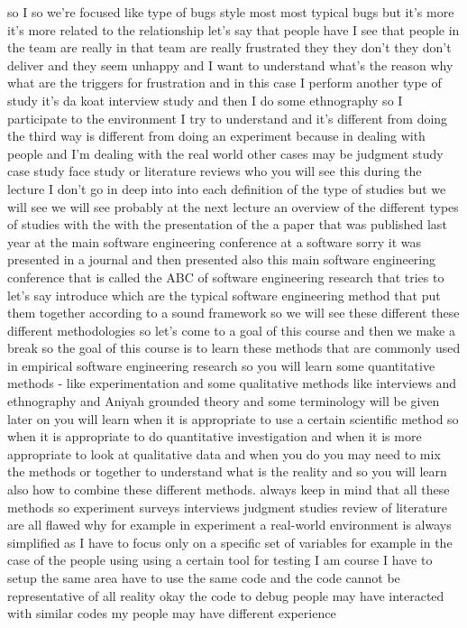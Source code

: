 \documentclass[conference, compsoc, twoside]{IEEEtran}
\begin{document}
so I so we're focused like type of bugs style most most typical bugs but it's more it's more related to the relationship let's say that people have I see that people in the team are really in that team are really frustrated they they don't they don't deliver and they seem unhappy and I want to understand what's the reason why what are the triggers for frustration and in this case I perform another type of study it's da koat interview study and then I do some ethnography 
so I participate to the environment I try to understand and it's different from doing the third way is different from doing an experiment because in dealing with people and I'm dealing with the real world other cases may be judgment study case study face study or literature reviews who you will see this during the lecture I don't go in deep into into each definition of the type of studies but we will see we will see probably at the next lecture an overview of the different types of studies with the with the presentation of the a paper that was published last year at the main software engineering conference at a software sorry it was presented in a journal and then presented also this main software engineering conference that is called the ABC of software engineering research that tries to let's say introduce which are the typical software engineering method that put them together according to a sound framework so we will see these different these different methodologies so let's come to a goal of this course and then we make a break so the goal of this course is to learn these methods that are commonly used in empirical software engineering research so you will learn some quantitative methods - like experimentation and some qualitative methods like interviews and ethnography and Aniyah grounded theory and some terminology will be given later on you will learn when it is appropriate to use a certain scientific method so when it is appropriate to do quantitative investigation and when it is more appropriate to look at qualitative data and when you do you may need to mix the methods or together to understand what is the reality and so you will learn also how to combine these different methods. 
 always keep in mind that all these methods so experiment surveys interviews judgment studies review of literature are all flawed why 
for example in experiment a real-world environment is always simplified as I have to focus only on a specific set of variables 
for example in the case of the people using using a certain tool for testing I am course I have to setup the same area have to use the same code and the code cannot be representative of all reality okay the code to debug people may have interacted with similar codes my people may have different experience 
\end{document}
